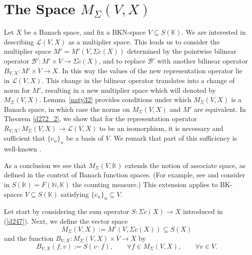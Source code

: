 \documentclass[14pt, a4paper]{article}  %
\providecommand{\pare}[1]{\left( #1\right) }
\newcommand{\K}{\mathbb{K}}
\newcommand{\N}{\mathbb{N}}
\newcommand{\BK}{\text{BK}}
\newcommand{\BKa}{\text{BKN}}
\newcommand{\BB}{\mathscr{B}}
\newcommand{\Mt}{M'}
\begin{document}
		\section{ The Space $M_{\Sigma}\pare{V,X}$}\label{sec10}\label{pop10}
Let $X$ be a Banach space, and fix a $\BKa$-space $V \subseteq S(\K)$. We are interested in describing $\mathcal{L}(V, X)$ as a multiplier space. This leads us to consider the multiplier space $M' = M'(V, \Sigma c(X))$ determined by the pointwise bilinear operator $\BB': M' \times V \to \Sigma c(X)$, and to replace $\BB'$ with another  bilinear operator $B_{V,X}: M' \times V \to X$. In this way the values of the new representation operator lie in $\mathcal{L}(V, X)$. This change in the bilinear operator translates into a change of norm for $M'$, resulting in a new multiplier space which  will denoted by $M_{\Sigma}(V, X)$. Lemma~\ref{naty32} provides conditions under which $M_{\Sigma}(V, X)$ is a Banach space, in which case the norms on $M_{\Sigma}(V, X)$ and $M'$ are equivalent. In Theorem \ref{d272_2}, we show that for the representation operator $R_{V,X}: M_{\Sigma}(V, X) \to \mathcal{L}(V, X)$ to be an isomorphism, it is necessary and sufficient that $\{e_{n}\}_{n}$ be a basis of $V$. We remark that part of this sufficiency is well-known \cite[Thm. I.17.1, p. 211]{S}. 

 

As a conclusion we see that
$M_\Sigma (V, \K)$  extends the notion of associate space, as defined in the context of Banach function spaces. (For example, see  \cite{CDS}  and consider in $S(\K)=F(\N,\K)$ the counting measure.)   This extension   applies to $\BK$-spaces $V \subseteq S(\K)$ satisfying $\{e_n\}_n \subseteq V$.

 Let start by considering   the sum operator $S: \Sigma c(X) \to X$ introduced in (\ref{d247}). Next, we define  the vector space
 \begin{equation}\label{lola208}
 	M_{\Sigma}(V,X) := \Mt(V, \Sigma c(X)) \subseteq S(X)
 \end{equation}
 and the function $B_{V,X}: M_{\Sigma}(V,X) \times V \to X$ by
 \begin{equation}\label{lola126}
 	B_{V,X}(f, v) := S(v \cdot f), \qquad \forall f \in M_{\Sigma}(V,X), \qquad \forall v \in V.
 \end{equation}
 
\end{document}
